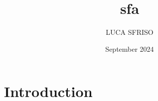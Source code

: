 \documentclass{article}
\title{sfa}
\author{LUCA SFRISO}
\date{September 2024}
\begin{document}
\maketitle

\section{Introduction}
\end{document}
